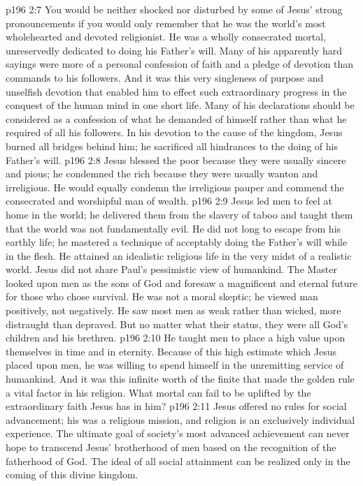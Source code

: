 \vs p196 2:7 You would be neither shocked nor disturbed by some of Jesus’ strong pronouncements if you would only remember that he was the world’s most wholehearted and devoted religionist. He was a wholly consecrated mortal, unreservedly dedicated to doing his Father’s will. Many of his apparently hard sayings were more of a personal confession of faith and a pledge of devotion than commands to his followers. And it was this very singleness of purpose and unselfish devotion that enabled him to effect such extraordinary progress in the conquest of the human mind in one short life. Many of his declarations should be considered as a confession of what he demanded of himself rather than what he required of all his followers. In his devotion to the cause of the kingdom, Jesus burned all bridges behind him; he sacrificed all hindrances to the doing of his Father’s will.
\vs p196 2:8 Jesus blessed the poor because they were usually sincere and pious; he condemned the rich because they were usually wanton and irreligious. He would equally condemn the irreligious pauper and commend the consecrated and worshipful man of wealth.
\vs p196 2:9 Jesus led men to feel at home in the world; he delivered them from the slavery of taboo and taught them that the world was not fundamentally evil. He did not long to escape from his earthly life; he mastered a technique of acceptably doing the Father’s will while in the flesh. He attained an idealistic religious life in the very midst of a realistic world. Jesus did not share Paul’s pessimistic view of humankind. The Master looked upon men as the sons of God and foresaw a magnificent and eternal future for those who chose survival. He was not a moral skeptic; he viewed man positively, not negatively. He saw most men as weak rather than wicked, more distraught than depraved. But no matter what their status, they were all God’s children and his brethren.
\vs p196 2:10 He taught men to place a high value upon themselves in time and in eternity. Because of this high estimate which Jesus placed upon men, he was willing to spend himself in the unremitting service of humankind. And it was this infinite worth of the finite that made the golden rule a vital factor in his religion. What mortal can fail to be uplifted by the extraordinary faith Jesus has in him?
\vs p196 2:11 Jesus offered no rules for social advancement; his was a religious mission, and religion is an exclusively individual experience. The ultimate goal of society’s most advanced achievement can never hope to transcend Jesus’ brotherhood of men based on the recognition of the fatherhood of God. The ideal of all social attainment can be realized only in the coming of this divine kingdom.
